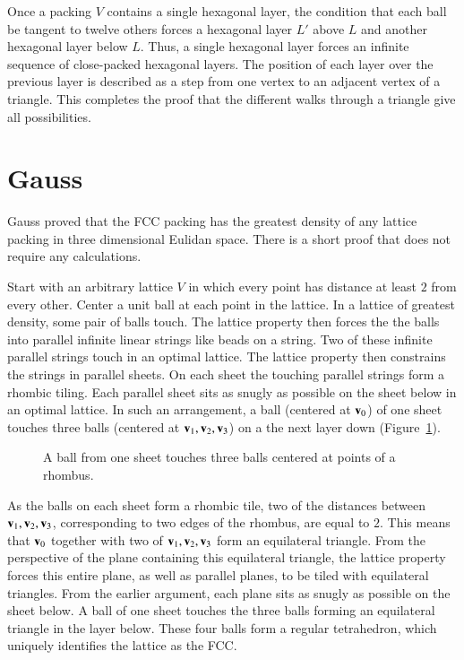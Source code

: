 Once a packing $V$ contains a single hexagonal layer, the condition
that each ball be tangent to twelve others forces a hexagonal layer
$L'$ above $L$ and another hexagonal layer below $L$.  Thus, a single
hexagonal layer forces an infinite sequence of close-packed hexagonal
layers.  The position of each layer over the previous layer is described 
as a step from one vertex to an adjacent vertex of a triangle.
This completes the proof that the different walks through a triangle give
all possibilities.



\section{Gauss}

Gauss proved that the FCC packing has the greatest density
of any lattice packing in three dimensional Eulidan space.  There is a
short proof that does not require any calculations.

Start with an arbitrary lattice $V$ in which every point has distance
at least $2$ from every other.  Center a unit ball at each point in
the lattice.  In a lattice of greatest density, some pair of balls
touch.  The lattice property then forces the the balls into parallel
infinite linear strings like beads on a string.  Two of these infinite
parallel strings touch in an optimal lattice.  The
lattice property then constrains the strings in parallel sheets.  On
each sheet the touching parallel strings form a rhombic tiling.  Each
parallel sheet sits as snugly as possible on the sheet below in an optimal
lattice.  In such an arrangement, a ball (centered at
${\mathbf v}_0$) of one sheet touches three balls (centered at
${\mathbf v}_1,{\mathbf v}_2,{\mathbf v}_3$) on a the next layer down (Figure~\ref{fig:rhombus}).

\begin{figure}[htb]
  \centering
  \caption{A ball from one sheet touches three balls centered at points of a rhombus.}
  \label{fig:rhombus}
\end{figure}

As the balls on each sheet form a rhombic tile, two of the distances
between ${\mathbf v}_1,{\mathbf v}_2,{\mathbf v}_3$, corresponding to two edges of the rhombus, are
equal to $2$.  This means that ${\mathbf v}_0$ together with two of
${\mathbf v}_1,{\mathbf v}_2,{\mathbf v}_3$ form an equilateral triangle.  From the perspective of
the plane containing this equilateral triangle, the lattice property
forces this entire plane, as well as parallel planes, to be tiled with
equilateral triangles.  From the earlier argument, each plane sits as
snugly as possible on the sheet below.  A ball of one sheet touches
the three balls forming an equilateral triangle in the layer below.
These four balls form a regular tetrahedron, which
uniquely identifies the lattice as the FCC.






